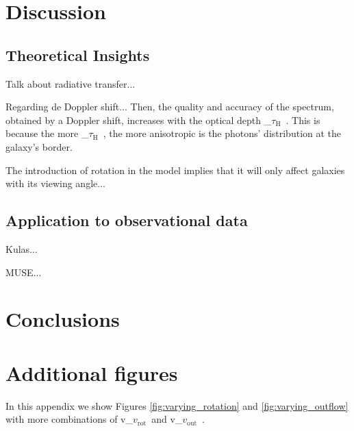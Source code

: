 \documentclass[a4paper,fleqn,usenatbib]{mnras}
\newcommand{\vrot}{\ifmmode\mathrm v_{\mathrm{rot}}\else $v_{\mathrm{rot}}$~\fi}
\newcommand{\vout}{\ifmmode\mathrm v_{\mathrm{out}}\else $v_{\mathrm{out}}$~\fi}
\newcommand{\tauh}{\ifmmode\mathrm \tau_{\mathrm{H}}\else $\tau_{\mathrm{H}}$~\fi}
\begin{document}
\section{Discussion}
\label{sec:discussion}

\subsection{Theoretical Insights}
Talk about radiative transfer... 

Regarding de Doppler shift... Then, the quality and accuracy of 
the spectrum, obtained by a Doppler shift, increases with the optical depth \tauh. 
This is because the more \tauh, the more anisotropic is the photons' distribution 
at the galaxy's border. 

The introduction of rotation in the model implies that it will only affect 
galaxies with its viewing angle...

\subsection{Application to observational data}

Kulas...

MUSE...



\section{Conclusions}
\label{sec:conclusions}







\appendix

\section{Additional figures}
\label{sec:appendix}

In this appendix we show Figures \ref{fig:varying_rotation} and \ref{fig:varying_outflow} with more combinations of \vrot and \vout.
\end{document}
